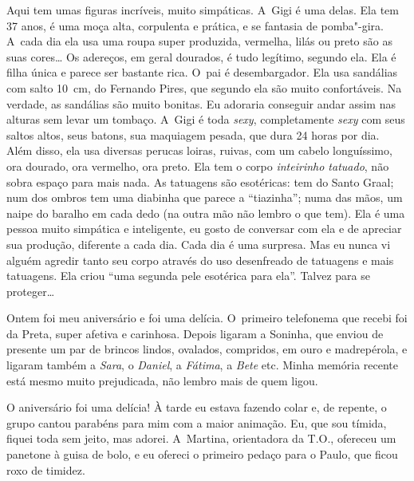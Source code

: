 Aqui tem umas figuras incríveis, muito simpáticas. A~Gigi é uma delas.
Ela tem 37 anos, é uma moça alta, corpulenta e prática, e se fantasia de
pomba"-gira. A~cada dia ela usa uma roupa super produzida, vermelha,
lilás ou preto são as suas cores… Os adereços, em geral dourados,
é tudo legítimo, segundo ela. Ela é filha única e parece ser bastante
rica. O~pai é desembargador. Ela usa sandálias com salto 10\, cm, do
Fernando Pires, que segundo ela são muito confortáveis. Na verdade, as
sandálias são muito bonitas. Eu adoraria conseguir andar assim nas
alturas sem levar um tombaço. A~Gigi é toda \emph{sexy}, completamente
\emph{sexy} com seus saltos altos, seus batons, sua maquiagem pesada,
que dura 24 horas por dia. Além disso, ela usa diversas perucas loiras,
ruivas, com um cabelo longuíssimo, ora dourado, ora vermelho, ora
preto. Ela tem o corpo \emph{inteirinho tatuado}, não sobra espaço
para mais nada. As tatuagens são esotéricas: tem do Santo Graal; num dos
ombros tem uma diabinha que parece a ``tiazinha''; numa das mãos, um
naipe do baralho em cada dedo (na outra mão não lembro o que tem). Ela é
uma pessoa muito simpática e inteligente, eu gosto de conversar com ela
e de apreciar sua produção, diferente a cada dia. Cada dia é uma
surpresa. Mas eu nunca vi alguém agredir tanto seu corpo através do uso
desenfreado de tatuagens e mais tatuagens. Ela criou ``uma segunda pele
esotérica para ela''. Talvez para se proteger…

Ontem foi meu aniversário e foi uma delícia. O~primeiro telefonema que
recebi foi da Preta, super afetiva e carinhosa. Depois ligaram a
Soninha, que enviou de presente um par de brincos lindos, ovalados,
compridos, em ouro e madrepérola, e ligaram também a \emph{Sara}, o
\emph{Daniel}, a \emph{Fátima}, a \emph{Bete} etc. Minha memória recente
está mesmo muito prejudicada, não lembro mais de quem ligou.

O aniversário foi uma delícia! À tarde eu estava fazendo colar e, de
repente, o grupo cantou parabéns para mim com a maior animação. Eu, que
sou tímida, fiquei toda sem jeito, mas adorei. A~Martina, orientadora da
T.O., ofereceu um panetone à guisa de bolo, e eu ofereci o primeiro
pedaço para o Paulo, que ficou roxo de timidez.

